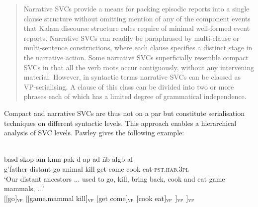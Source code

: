 \begin{quote}Narrative SVCs provide a means for packing episodic reports into a single clause structure without omitting mention of any of the component events that Kalam discourse structure rules require of minimal well-formed event reports. Narrative SVCs can readily be paraphrased by multi-clause or multi-sentence constructions, where each clause specifies a distinct stage in the narrative action. Some narrative SVCs superficially resemble compact SVCs in that all the verb roots occur contiguously, without any intervening material. However, in syntactic terms narrative SVCs can be classed as VP-serialising. A clause of this class can be divided into two or more phrases each of which has a limited degree of grammatical independence. \citep[174]{pawley2008serial}\end{quote}

Compact and narrative SVCs are thus not on a par but constitute serialisation techniques on different syntactic levels. This approach enables a hierarchical analysis of SVC levels. Pawley gives the following example:

\ea \label{}
\\
\ea
\gll basd skop am kmn pak d ap ad ñb-algb-al \\
g'father distant go animal kill get come cook eat-\textsc{pst}.\textsc{hab}.\textsc{3}\textsc{pl} \\
\glft `Our distant ancestors ... used to go, kill, bring back, cook and eat game mammals, ...'\\ 
\ex
$[[$go$]_{\textsc{vp}}$ $[[$game.mammal kill$]_{\textsc{vp}}$ $[$get come$]_{\textsc{vp}}$ $[$cook eat$]_{\textsc{vp}}$ $]_{\textsc{vp}}$ $]_{\textsc{vp}}$\\
\z
\z

